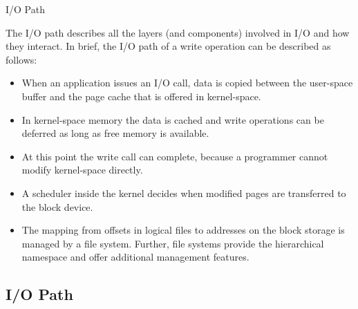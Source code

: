 \documentclass[compress,11pt,xcolor=svgnames,aspectratio=169]{beamer}
\begin{document}
\begin{frame}[t]{I/O Path}

The I/O path describes all the layers (and components) involved in I/O and how they interact.
In brief, the I/O path of a write operation can be described as follows:

    \begin{itemize}

        \item When an application issues an I/O call, data is copied between the user-space buffer and the page cache that is offered in kernel-space.

        \item In kernel-space memory the data is cached and write operations can be deferred as long as free memory is available.

        \item At this point the write call can complete, because a programmer cannot modify kernel-space directly.

        \item A scheduler inside the kernel decides when modified pages are transferred to the block device.

        \item The mapping from offsets in logical files to addresses on the block storage is managed by a file system. Further, file systems provide the hierarchical namespace and offer additional management features.

    \end{itemize}

\end{frame}

\subsection{I/O Path}
\end{document}
